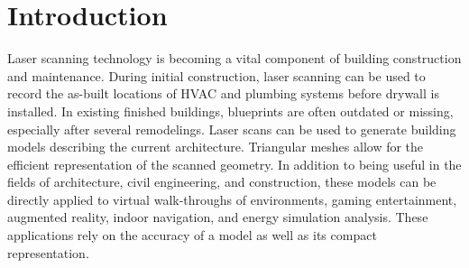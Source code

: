 \documentclass[12pt,onecolumn,oneside]{book}
\begin{document}

\newpage
{}
\setcounter{page}{1}

\chapter{Introduction}
\label{ch:introduction}

Laser scanning technology is becoming a vital component of building construction and maintenance.  During initial construction, laser scanning can be used to record the as-built locations of HVAC and plumbing systems before drywall is installed.  In existing finished buildings, blueprints are often outdated or missing, especially after several remodelings.  Laser scans can be used to generate building models describing the current architecture.  Triangular meshes allow for the efficient representation of the scanned geometry.  In addition to being useful in the fields of architecture, civil engineering, and construction, these models can be directly applied to virtual walk-throughs of environments, gaming entertainment, augmented reality, indoor navigation, and energy simulation analysis.  These applications rely on the accuracy of a model as well as its compact representation.
\end{document}
